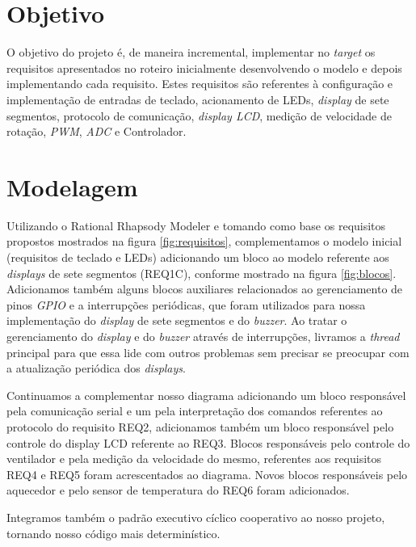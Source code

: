 \documentclass{article}
\begin{document}


\onehalfspacing
\section{Objetivo} 
O objetivo do projeto é, de maneira incremental, implementar no \textit{target} os requisitos apresentados no roteiro\cite{bb:roteiro} inicialmente desenvolvendo o modelo e depois implementando cada requisito. Estes requisitos são referentes à configuração e implementação de entradas de teclado, acionamento de LEDs, \textit{display} de sete segmentos, protocolo de comunicação, \textit{display LCD}, medição de velocidade de rotação, \textit{PWM}, \textit{ADC} e Controlador. 
	
\section{Modelagem}
Utilizando o Rational Rhapsody Modeler e tomando como base os requisitos propostos mostrados na figura \ref{fig:requisitos}, complementamos o modelo inicial\cite{bb:modelo} (requisitos de teclado e LEDs) adicionando um bloco ao modelo referente aos \textit{displays} de sete segmentos (REQ1C), conforme mostrado na figura \ref{fig:blocos}. Adicionamos também alguns blocos auxiliares relacionados ao gerenciamento de pinos \textit{GPIO} e a interrupções periódicas, que foram utilizados para nossa implementação do \textit{display} de sete segmentos e do \textit{buzzer}. Ao tratar o gerenciamento do \textit{display} e do \textit{buzzer} através de interrupções, livramos a \textit{thread} principal para que essa lide com outros problemas sem precisar se preocupar com a atualização periódica dos \textit{displays}.

Continuamos a complementar nosso diagrama adicionando um bloco responsável pela comunicação serial e um pela interpretação dos comandos referentes ao protocolo do requisito REQ2, adicionamos também um bloco responsável pelo controle do display LCD referente ao REQ3. Blocos responsáveis pelo controle do ventilador e pela medição da velocidade do mesmo, referentes aos requisitos REQ4 e REQ5 foram acrescentados ao diagrama.
Novos blocos responsáveis pelo aquecedor e pelo sensor de temperatura do REQ6 foram adicionados.

Integramos também o padrão executivo cíclico cooperativo ao nosso projeto, tornando nosso código mais determinístico.
\end{document}
